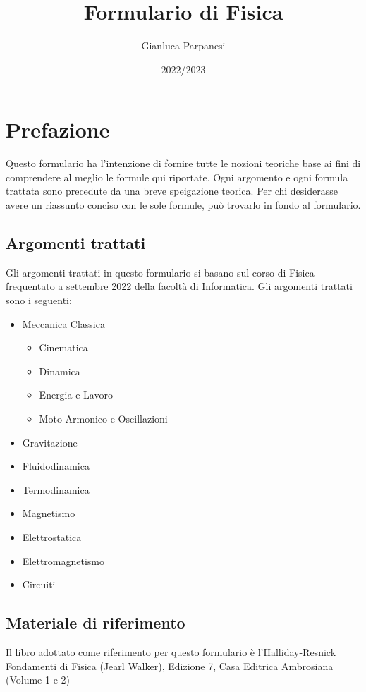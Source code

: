 \documentclass[12pt, a4paper, openany]{book}
\begin{document}
\title{Formulario di Fisica}
\author{Gianluca Parpanesi}
\date{2022/2023}
\maketitle

\section*{Prefazione}

Questo formulario ha l'intenzione di fornire tutte le nozioni teoriche base ai 
fini di comprendere al meglio le formule qui riportate.
Ogni argomento e ogni formula trattata sono precedute da una breve speigazione
teorica.
Per chi desiderasse avere un riassunto conciso con le sole formule, può 
trovarlo in fondo al formulario.
    \subsection*{Argomenti trattati}
    Gli argomenti trattati in questo formulario si basano sul corso di Fisica 
    frequentato a settembre 2022 della facoltà di Informatica. Gli argomenti
    trattati sono i seguenti:
    \begin{itemize}
        \item Meccanica Classica
        \begin{itemize}
            \item Cinematica 
            \item Dinamica
            \item Energia e Lavoro
            \item Moto Armonico e Oscillazioni
        \end{itemize}
        \item Gravitazione 
        \item Fluidodinamica
        \item Termodinamica
        \item Magnetismo
        \item Elettrostatica
        \item Elettromagnetismo
        \item Circuiti
    \end{itemize}

    \subsection*{Materiale di riferimento}
    Il libro adottato come riferimento per questo formulario è 
    l'Halliday-Resnick Fondamenti di Fisica (Jearl Walker), Edizione 7, Casa 
    Editrica Ambrosiana (Volume 1 e 2)
\end{document}
